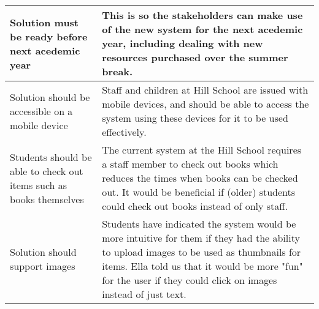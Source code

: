 \documentclass[../../../main.tex]{subfiles}
\begin{document}
\begin{tabular}{ |p{}|p{}| }
    \hline
    Solution must be ready before next acedemic year                                                              & This is so the stakeholders can make use of
    the new system for the next acedemic year, including dealing with new resources purchased over
    the summer break.                                                                                                                                                                                              \\
    \hline
    Solution should be accessible on a mobile device                                                              & Staff and children at Hill School are issued
    with mobile devices, and should be able to access the system using these devices for it to be
    used effectively.                                                                                                                                                                                              \\
    \hline
    Students should be able to check out items such as books themselves                                           & The current system at
    the Hill School requires a staff member to check out books which reduces the times when books
    can be checked out. It would be beneficial if (older) students could check out books instead of only staff.                                                                                                    \\
    \hline
    Solution should support images                                                                                & Students have indicated the system would be more intuitive for them if they had
    the ability to upload images to be used as thumbnails for items. Ella told us that it would be more "fun" for the user if they could click on images instead of just text.                                     \\
    \hline
\end{tabular}
\end{document}
